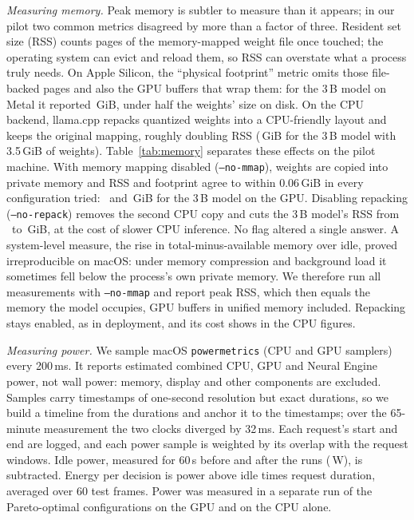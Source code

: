 \textit{Measuring memory.} Peak memory is subtler to measure than it appears; in our pilot two common metrics disagreed by more than a factor of three. Resident set size (RSS) counts pages of the memory-mapped weight file once touched; the operating system can evict and reload them, so RSS can overstate what a process truly needs. On Apple Silicon, the ``physical footprint'' metric omits those file-backed pages and also the GPU buffers that wrap them: for the 3\,B model on Metal it reported \PilotLargeGpuFootprintGiB\,GiB, under half the weights' size on disk. On the CPU backend, llama.cpp repacks quantized weights into a CPU-friendly layout and keeps the original mapping, roughly doubling RSS (\PilotLargeCpuRssGiB\,GiB for the 3\,B model with 3.5\,GiB of weights). Table~\ref{tab:memory} separates these effects on the pilot machine. With memory mapping disabled (\texttt{--no-mmap}), weights are copied into private memory and RSS and footprint agree to within 0.06\,GiB in every configuration tried: \AblLargeGpuNoMmapRssGiB\ and \AblLargeGpuNoMmapFpGiB\,GiB for the 3\,B model on the GPU. Disabling repacking (\texttt{--no-repack}) removes the second CPU copy and cuts the 3\,B model's RSS from \AblLargeCpuDefaultRssGiB\ to \AblLargeCpuNoRepackRssGiB\,GiB, at the cost of slower CPU inference. No flag altered a single answer. A system-level measure, the rise in total-minus-available memory over idle, proved irreproducible on macOS: under memory compression and background load it sometimes fell below the process's own private memory. We therefore run all measurements with \texttt{--no-mmap} and report peak RSS, which then equals the memory the model occupies, GPU buffers in unified memory included. Repacking stays enabled, as in deployment, and its cost shows in the CPU figures.

\begin{table}[t]
\centering
\caption{Memory accounting on the pilot machine (\PilotCpu, \PilotRamGB\,GB, macOS), Q8\_0, prompt~\promptA, 30 requests per row. ``Same answers'' compares with the default flags. Latencies are relative only: other applications were running.}
\label{tab:memory}
\footnotesize
\setlength{\tabcolsep}{5pt}

\end{table}

\textit{Measuring power.} We sample macOS \texttt{powermetrics} (CPU and GPU samplers) every 200\,ms. It reports estimated combined CPU, GPU and Neural Engine power, not wall power: memory, display and other components are excluded. Samples carry timestamps of one-second resolution but exact durations, so we build a timeline from the durations and anchor it to the timestamps; over the 65-minute measurement the two clocks diverged by 32\,ms. Each request's start and end are logged, and each power sample is weighted by its overlap with the request windows. Idle power, measured for 60\,s before and after the runs (\PIdleW\,W), is subtracted. Energy per decision is power above idle times request duration, averaged over 60 test frames. Power was measured in a separate run of the Pareto-optimal configurations on the GPU and on the CPU alone.

